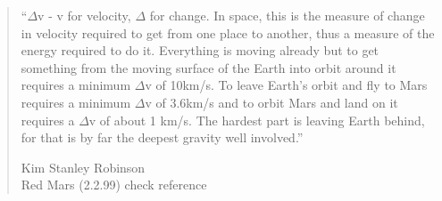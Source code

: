 \phantom{.}
\vspace{0.7in}

\begin{singlespace}
\begin{quote}
``$\Delta$v - v for velocity, $\Delta$ for change. In space, this is the measure of change in velocity required to get from one place to another, thus a measure of the energy required to do it. Everything is moving already but to get something from the moving surface of the Earth into orbit around it requires a minimum $\Delta$v of 10km/s. To leave Earth's orbit and fly to Mars requires a minimum $\Delta$v of 3.6km/s and to orbit Mars and land on it requires a $\Delta$v of about 1 km/s. The hardest part is leaving Earth behind, for that is by far the deepest gravity well involved.''

Kim Stanley Robinson\\
Red Mars (2.2.99) {\color{red} check reference}
\end{quote}
\end{singlespace}

%
